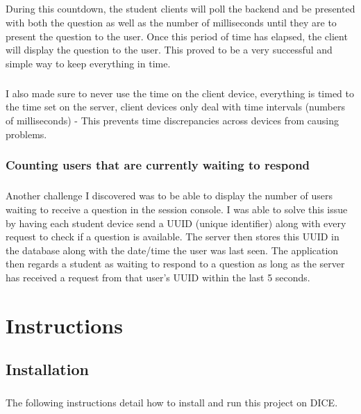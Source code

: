 \documentclass[10pt]{report}
\begin{document}
	\paragraph{}
	During this countdown, the student clients will poll the backend and be presented with both the
	question as well as the number of milliseconds until they are to present the question to the user.
	Once this period of time has elapsed, the client will display the question to the user.  This proved
	to be a very successful and simple way to keep everything in time.
	
	\paragraph{}
	I also made sure to never use the time on the client device, everything is timed to the time set on
	the server, client devices only deal with time intervals (numbers of milliseconds) - This prevents
	time discrepancies across devices from causing problems.
	
	\subsection*{Counting users that are currently waiting to respond}
	\paragraph{}
	Another challenge I discovered was to be able to display the number of users waiting to receive a
	question in the session console.  I was able to solve this issue by having each student device send
	a UUID (unique identifier) along with every request to check if a question is available.  The server
	then stores this UUID in the database along with the date/time the user was last seen.  The
	application	then regards a student as waiting to respond to a question as long as the server has
	received a request from that user's UUID within the last 5 seconds.
    
    \chapter*{Instructions}
    \section*{Installation}
    \paragraph{}
    The following instructions detail how to install and run this project on DICE.
    
\end{document}
